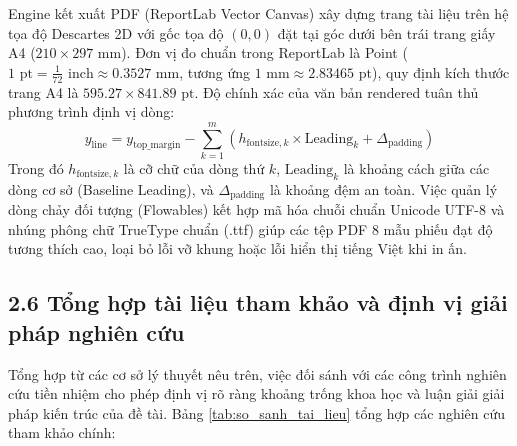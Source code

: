 \documentclass[12pt,a4paper]{report}
\begin{document}
Engine kết xuất PDF (ReportLab Vector Canvas) xây dựng trang tài liệu trên hệ tọa độ Descartes 2D với gốc tọa độ $(0,0)$ đặt tại góc dưới bên trái trang giấy A4 ($210 \times 297$ mm). Đơn vị đo chuẩn trong ReportLab là Point ($1\text{ pt} = \frac{1}{72}\text{ inch} \approx 0.3527\text{ mm}$, tương ứng $1\text{ mm} \approx 2.83465\text{ pt}$), quy định kích thước trang A4 là $595.27 \times 841.89\text{ pt}$. Độ chính xác của văn bản rendered tuân thủ phương trình định vị dòng:
\begin{equation}
  y_{\text{line}} = y_{\text{top\_margin}} - \sum_{k=1}^{m} \left( h_{\text{fontsize}, k} \times \text{Leading}_k + \Delta_{\text{padding}} \right)
\end{equation}
Trong đó $h_{\text{fontsize}, k}$ là cỡ chữ của dòng thứ $k$, $\text{Leading}_k$ là khoảng cách giữa các dòng cơ sở (Baseline Leading), và $\Delta_{\text{padding}}$ là khoảng đệm an toàn. Việc quản lý dòng chảy đối tượng (Flowables) kết hợp mã hóa chuỗi chuẩn Unicode UTF-8 và nhúng phông chữ TrueType chuẩn (.ttf) giúp các tệp PDF 8 mẫu phiếu đạt độ tương thích cao, loại bỏ lỗi vỡ khung hoặc lỗi hiển thị tiếng Việt khi in ấn.

\subsection*{2.6 Tổng hợp tài liệu tham khảo và định vị giải pháp nghiên cứu}
Tổng hợp từ các cơ sở lý thuyết nêu trên, việc đối sánh với các công trình nghiên cứu tiền nhiệm cho phép định vị rõ ràng khoảng trống khoa học và luận giải giải pháp kiến trúc của đề tài. Bảng \ref{tab:so_sanh_tai_lieu} tổng hợp các nghiên cứu tham khảo chính:
\end{document}
